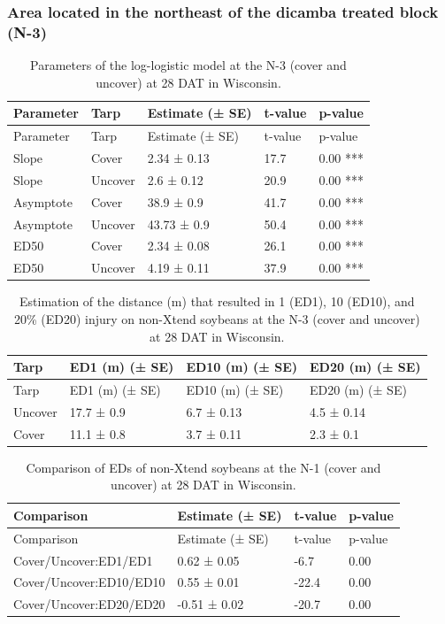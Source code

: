 \documentclass[]{article}
\begin{document}
\pagebreak

\subsubsection{Area located in the northeast of the dicamba treated
block
(N-3)}\label{area-located-in-the-northeast-of-the-dicamba-treated-block-n-3}

\begin{longtable}[]{@{}lllll@{}}
\caption{Parameters of the log-logistic model at the N-3 (cover and
uncover) at 28 DAT in Wisconsin.}\tabularnewline
\toprule
Parameter & Tarp & Estimate (± SE) & t-value & p-value\tabularnewline
\midrule
\endfirsthead
\toprule
Parameter & Tarp & Estimate (± SE) & t-value & p-value\tabularnewline
\midrule
\endhead
Slope & Cover & 2.34 ± 0.13 & 17.7 & 0.00 ***\tabularnewline
Slope & Uncover & 2.6 ± 0.12 & 20.9 & 0.00 ***\tabularnewline
Asymptote & Cover & 38.9 ± 0.9 & 41.7 & 0.00 ***\tabularnewline
Asymptote & Uncover & 43.73 ± 0.9 & 50.4 & 0.00 ***\tabularnewline
ED50 & Cover & 2.34 ± 0.08 & 26.1 & 0.00 ***\tabularnewline
ED50 & Uncover & 4.19 ± 0.11 & 37.9 & 0.00 ***\tabularnewline
\bottomrule
\end{longtable}

\begin{longtable}[]{@{}llll@{}}
\caption{Estimation of the distance (m) that resulted in 1 (ED1), 10
(ED10), and 20\% (ED20) injury on non-Xtend soybeans at the N-3 (cover
and uncover) at 28 DAT in Wisconsin.}\tabularnewline
\toprule
Tarp & ED1 (m) (± SE) & ED10 (m) (± SE) & ED20 (m) (± SE)\tabularnewline
\midrule
\endfirsthead
\toprule
Tarp & ED1 (m) (± SE) & ED10 (m) (± SE) & ED20 (m) (± SE)\tabularnewline
\midrule
\endhead
Uncover & 17.7 ± 0.9 & 6.7 ± 0.13 & 4.5 ± 0.14\tabularnewline
Cover & 11.1 ± 0.8 & 3.7 ± 0.11 & 2.3 ± 0.1\tabularnewline
\bottomrule
\end{longtable}

\begin{longtable}[]{@{}llll@{}}
\caption{Comparison of EDs of non-Xtend soybeans at the N-1 (cover and
uncover) at 28 DAT in Wisconsin.}\tabularnewline
\toprule
Comparison & Estimate (± SE) & t-value & p-value\tabularnewline
\midrule
\endfirsthead
\toprule
Comparison & Estimate (± SE) & t-value & p-value\tabularnewline
\midrule
\endhead
Cover/Uncover:ED1/ED1 & 0.62 ± 0.05 & -6.7 & 0.00\tabularnewline
Cover/Uncover:ED10/ED10 & 0.55 ± 0.01 & -22.4 & 0.00\tabularnewline
Cover/Uncover:ED20/ED20 & -0.51 ± 0.02 & -20.7 & 0.00\tabularnewline
\bottomrule
\end{longtable}
\end{document}

